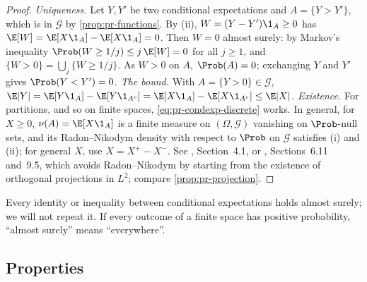 \begin{proof}
\emph{Uniqueness.} Let $Y,Y'$ be two conditional expectations and $A=\{Y>Y'\}$, which is in
$\mathcal G$ by \cref{prop:pr-functions}. By (ii), $W=(Y-Y')\1_A\ge0$ has
$\E[W]=\E[X\1_A]-\E[X\1_A]=0$. Then $W=0$ almost surely: by Markov's inequality
$\Prob(W\ge1/j)\le j\,\E[W]=0$ for all $j\ge1$, and $\{W>0\}=\bigcup_j\{W\ge1/j\}$. As $W>0$
on $A$, $\Prob(A)=0$; exchanging $Y$ and $Y'$ gives $\Prob(Y<Y')=0$. \emph{The bound.} With
$A=\{Y>0\}\in\mathcal G$, $\E|Y|=\E[Y\1_A]-\E[Y\1_{A^c}]=\E[X\1_A]-\E[X\1_{A^c}]\le\E|X|$.
\emph{Existence.} For partitions, and so on finite spaces, \eqref{eq:pr-condexp-discrete}
works. In general, for $X\ge0$, $\nu(A)=\E[X\1_A]$ is a finite measure on $(\Omega,\mathcal
G)$ vanishing on $\Prob$-null sets, and its Radon--Nikodym density with respect to $\Prob$ on
$\mathcal G$ satisfies (i) and (ii); for general $X$, use $X=X^+-X^-$. See
\textcite{durrett}, Section~4.1, or \textcite{williams}, Sections~6.11 and~9.5, which avoids
Radon--Nikodym by starting from the existence of orthogonal projections in $L^2$; compare
\cref{prop:pr-projection}.
\end{proof}

Every identity or inequality between conditional expectations holds almost surely; we
will not repeat it. If every outcome of a finite space has positive probability, ``almost
surely'' means ``everywhere''.

\subsection{Properties}

